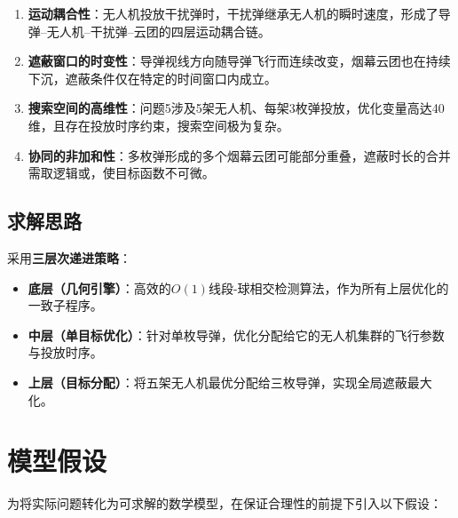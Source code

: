 \documentclass[12pt,a4paper]{ctexart}
\begin{document}
\begin{enumerate}
    \item \textbf{运动耦合性}：无人机投放干扰弹时，干扰弹继承无人机的瞬时速度，形成了导弹--无人机--干扰弹--云团的四层运动耦合链。
    \item \textbf{遮蔽窗口的时变性}：导弹视线方向随导弹飞行而连续改变，烟幕云团也在持续下沉，遮蔽条件仅在特定的时间窗口内成立。
    \item \textbf{搜索空间的高维性}：问题5涉及5架无人机、每架3枚弹投放，优化变量高达40维，且存在投放时序约束，搜索空间极为复杂。
    \item \textbf{协同的非加和性}：多枚弹形成的多个烟幕云团可能部分重叠，遮蔽时长的合并需取逻辑或，使目标函数不可微。
\end{enumerate}

\subsection{求解思路}

采用\textbf{三层次递进策略}：
\begin{itemize}
    \item \textbf{底层（几何引擎）}：高效的$O(1)$线段-球相交检测算法，作为所有上层优化的一致子程序。
    \item \textbf{中层（单目标优化）}：针对单枚导弹，优化分配给它的无人机集群的飞行参数与投放时序。
    \item \textbf{上层（目标分配）}：将五架无人机最优分配给三枚导弹，实现全局遮蔽最大化。
\end{itemize}

\section{模型假设}

为将实际问题转化为可求解的数学模型，在保证合理性的前提下引入以下假设：
\end{document}
